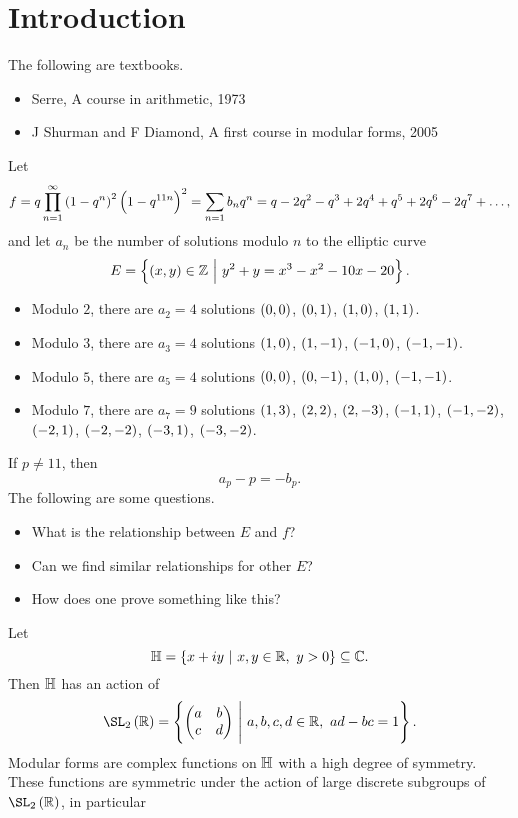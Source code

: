 





\section{Introduction}


The following are textbooks.
\begin{itemize}
\item Serre, A course in arithmetic, 1973
\item J Shurman and F Diamond, A first course in modular forms, 2005
\end{itemize}

Let
$$ f = q\prod_{n = 1}^\infty \br{1 - q^n}^2\br{1 - q^{11n}}^2 = \sum_{n = 1} b_nq^n = q - 2q^2 - q^3 + 2q^4 + q^5 + 2q^6 - 2q^7 + \dots, $$
and let $ a_n $ be the number of solutions modulo $ n $ to the elliptic curve
$$ E = \cbr{\br{x, y} \in \ZZ \st y^2 + y = x^3 - x^2 - 10x - 20}. $$
\begin{itemize}
\item Modulo $ 2 $, there are $ a_2 = 4 $ solutions $ \br{0, 0} $, $ \br{0, 1} $, $ \br{1, 0} $, $ \br{1, 1} $.
\item Modulo $ 3 $, there are $ a_3 = 4 $ solutions $ \br{1, 0} $, $ \br{1, -1} $, $ \br{-1, 0} $, $ \br{-1, -1} $.
\item Modulo $ 5 $, there are $ a_5 = 4 $ solutions $ \br{0, 0} $, $ \br{0, -1} $, $ \br{1, 0} $, $ \br{-1, -1} $.
\item Modulo $ 7 $, there are $ a_7 = 9 $ solutions $ \br{1, 3} $, $ \br{2, 2} $, $ \br{2, -3} $, $ \br{-1, 1} $, $ \br{-1, -2} $, $ \br{-2, 1} $, $ \br{-2, -2} $, $ \br{-3, 1} $, $ \br{-3, -2} $.
\end{itemize}
If $ p \ne 11 $, then
$$ a_p - p = -b_p. $$
The following are some questions.
\begin{itemize}
\item What is the relationship between $ E $ and $ f $?
\item Can we find similar relationships for other $ E $?
\item How does one prove something like this?
\end{itemize}
Let
$$ \HH = \cbr{x + iy \st x, y \in \RR, \ y > 0} \subseteq \CC. $$
Then $ \mathbb{H} $ has an action of
$$ \SL_2\br{\RR} = \cbr{\twobytwo{a}{b}{c}{d} \st a, b, c, d \in \RR, \ ad - bc = 1}. $$
Modular forms are complex functions on $ \mathbb{H} $ with a high degree of symmetry. These functions are symmetric under the action of large discrete subgroups of $ \SL_2\br{\RR} $, in particular
